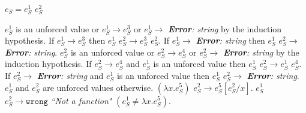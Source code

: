\begin{case}

$e_{S}=e_{S}^{1}$ $e_{S}^{2}$

$e_{S}^{1}$ is an unforced value or $e_{S}^{1}\rightarrow e_{S}^{3}$ or $e_{S}^{1}\rightarrow$ \emph{\textbf{Error}: string} by the induction hypothesis.  If $e_{S}^{1}\rightarrow e_{S}^{3}$ then $e_{S}^{1}$ $e_{S}^{2}\rightarrow e_{S}^{3}$ $e_{S}^{2}$.  If $e_{S}^{1}\rightarrow$ \emph{\textbf{Error}: string} then $e_{S}^{1}$ $e_{S}^{2}\rightarrow$ \emph{\textbf{Error}: string}.  $e_{S}^{2}$ is an unforced value or $e_{S}^{2}\rightarrow e_{S}^{4}$ or $e_{S}^{2}\rightarrow$ \emph{\textbf{Error}: string} by the induction hypothesis.  If $e_{S}^{2}\rightarrow e_{S}^{4}$ and $e_{S}^{1}$ is an unforced value then $e_{S}^{1}$ $e_{S}^{2}\rightarrow e_{S}^{1}$ $e_{S}^{4}$.  If $e_{S}^{2}\rightarrow$ \emph{\textbf{Error}: string} and $e_{S}^{1}$ is an unforced value then $e_{S}^{1}$ $e_{S}^{2}\rightarrow$ \emph{\textbf{Error}: string}.  $e_{S}^{1}$ and $e_{S}^{2}$ are unforced values otherwise.  $(\lambda x.e_{S}^{5})$ $e_{S}^{2}\rightarrow e_{S}^{5}[e_{S}^{2}/x]$.  $e_{S}^{1}$ $e_{S}^{2}\rightarrow\mathtt{wrong}$ \emph{``Not a function"} $(e_{S}^{1}\neq\lambda x.e_{S}^{5})$.

\end{case}